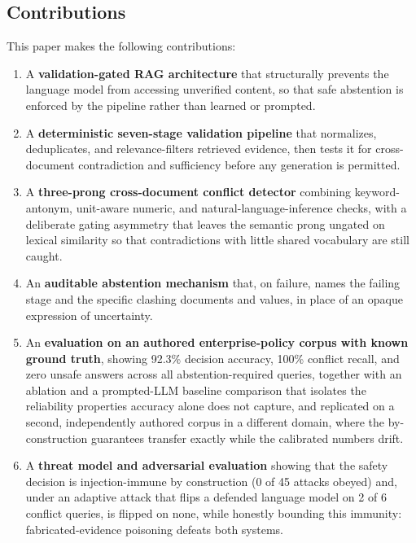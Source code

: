 \documentclass[conference]{IEEEtran}
\begin{document}
\subsection*{Contributions}
This paper makes the following contributions:
\begin{enumerate}
    \item A \textbf{validation-gated RAG architecture} that structurally
    prevents the language model from accessing unverified content, so that
    safe abstention is enforced by the pipeline rather than learned or
    prompted.
    \item A \textbf{deterministic seven-stage validation pipeline} that
    normalizes, deduplicates, and relevance-filters retrieved evidence, then
    tests it for cross-document contradiction and sufficiency before any
    generation is permitted.
    \item A \textbf{three-prong cross-document conflict detector} combining
    keyword-antonym, unit-aware numeric, and natural-language-inference
    checks, with a deliberate gating asymmetry that leaves the semantic
    prong ungated on lexical similarity so that contradictions with little
    shared vocabulary are still caught.
    \item An \textbf{auditable abstention mechanism} that, on failure, names
    the failing stage and the specific clashing documents and values, in
    place of an opaque expression of uncertainty.
    \item An \textbf{evaluation on an authored enterprise-policy corpus with
    known ground truth}, showing 92.3\% decision accuracy, 100\% conflict
    recall, and zero unsafe answers across all abstention-required queries,
    together with an ablation and a prompted-LLM baseline comparison that
    isolates the reliability properties accuracy alone does not capture, and
    replicated on a second, independently authored corpus in a different
    domain, where the by-construction guarantees transfer exactly while the
    calibrated numbers drift.
    \item A \textbf{threat model and adversarial evaluation} showing that the
    safety decision is injection-immune by construction (0 of 45 attacks
    obeyed) and, under an adaptive attack that flips a defended language model
    on 2 of 6 conflict queries, is flipped on none, while honestly bounding
    this immunity: fabricated-evidence poisoning defeats both systems.
\end{enumerate}

\end{document}
